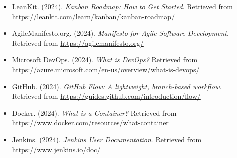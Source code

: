 \begin{enumerate}[label={\Alph*.}]
\begin{itemize}
          \item LeanKit. (2024). \textit{Kanban Roadmap: How to Get Started}. Retrieved from \url{https://leankit.com/learn/kanban/kanban-roadmap/}
          \item AgileManifesto.org. (2024). \textit{Manifesto for Agile Software Development}. Retrieved from \url{https://agilemanifesto.org/}
          \item Microsoft DevOps. (2024). \textit{What is DevOps?} Retrieved from \url{https://azure.microsoft.com/en-us/overview/what-is-devops/}
          \item GitHub. (2024). \textit{GitHub Flow: A lightweight, branch-based workflow}. Retrieved from \url{https://guides.github.com/introduction/flow/}
          \item Docker. (2024). \textit{What is a Container?} Retrieved from \url{https://www.docker.com/resources/what-container}
          \item Jenkins. (2024). \textit{Jenkins User Documentation}. Retrieved from \url{https://www.jenkins.io/doc/}
        \end{itemize}
\end{enumerate}